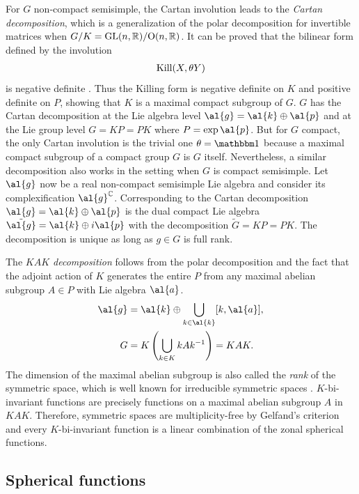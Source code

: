 For $G$ non-compact semisimple, the Cartan involution leads to the \emph{Cartan decomposition}, which is a generalization of the polar decomposition for invertible matrices when $G/K = \text{GL}(n,\mathbb{R})/\text{O}(n,\mathbb{R})$. It can be proved that the bilinear form defined by the involution
\begin{align}
	\text{Kill}(X,\theta Y)
\end{align}
is negative definite \cite{Knapp}. Thus the Killing form is negative definite on $K$ and positive definite on $P$, showing that $K$ is a maximal compact subgroup of $G$. $G$ has the Cartan decomposition at the Lie algebra level $\al{g} = \al{k} \oplus \al{p}$ and at the Lie group level $G = KP = PK$ where $P = \exp \al{p}$. But for $G$ compact, the only Cartan involution is the trivial one $\theta= \id$ because a maximal compact subgroup of a compact group $G$ is $G$ itself. Nevertheless, a similar decomposition also works in the setting when $G$ is compact semisimple. Let $\al{g}$ now be a real non-compact semisimple Lie algebra and consider its complexification $\al{g}^{\mathbb{C}}$. Corresponding to the Cartan decomposition $\al{g} = \al{k} \oplus \al{p}$ is the dual compact Lie algebra $\tilde{\al{g}} = \al{k} \oplus i\al{p}$ with the decomposition $\widetilde{G} = KP = PK $. The decomposition is unique as long as $g \in G$ is full rank. \cite[\S 1.2.3, p.56]{Vilenkin1}

The \emph{$KAK$ decomposition} follows from the polar decomposition and the fact that the adjoint action of $K$ generates the entire $P$ from any maximal abelian subgroup $A \in P$ with Lie algebra $\al{a}$.
\begin{align}\label{KAK}
\al{g} &= \al{k} \oplus \bigcup_{k \in \al{k}} [k,\al{a}], \\
G &= K \left( \bigcup_{k \in K} kAk^{-1} \right) = KAK.
\end{align}
The dimension of the maximal abelian subgroup is also called the \emph{rank} of the symmetric space, which is well known for irreducible symmetric spaces \cite{Helgason}. $K$-bi-invariant functions are precisely functions on a maximal abelian subgroup $A$ in $KAK$. Therefore, symmetric spaces are multiplicity-free by Gelfand's criterion and every $K$-bi-invariant function is a linear combination of the zonal spherical functions.

\subsection{Spherical functions}\label{ch2:spherical}

